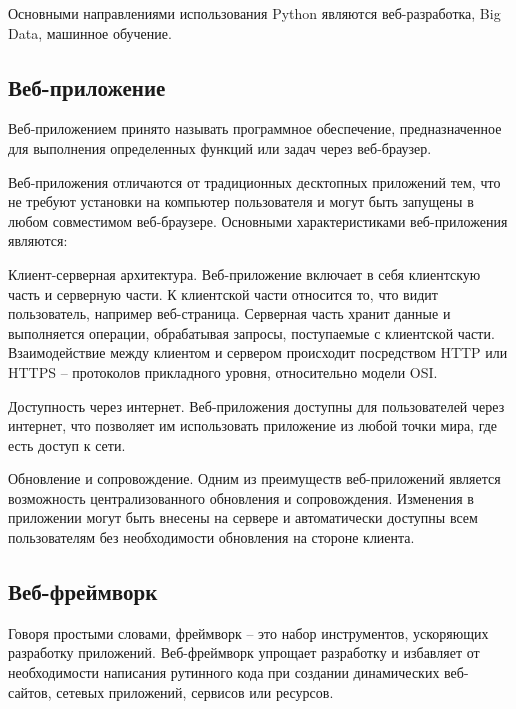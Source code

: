 Основными направлениями использования Python являются веб-разработка, Big Data, машинное обучение.


\subsection{Веб-приложение}\label{subsec:domain:web-application}
Веб-приложением принято называть программное обеспечение, предназначенное для выполнения определенных функций или задач через веб-браузер.

Веб-приложения отличаются от традиционных десктопных приложений тем, что не требуют установки на компьютер пользователя и могут быть запущены в любом совместимом веб-браузере.
Основными характеристиками веб-приложения являются:
\begin{enumerate_num}
    \item Клиент-серверная архитектура.
    Веб-приложение включает в себя клиентскую часть и серверную части.
    К клиентской части относится то, что видит пользователь, например веб-страница.
    Серверная часть хранит данные и выполняется операции, обрабатывая запросы, поступаемые с клиентской части.
    Взаимодействие между клиентом и сервером происходит посредством HTTP или HTTPS -- протоколов прикладного уровня, относительно модели OSI.
    \item Доступность через интернет.
    Веб-приложения доступны для пользователей через интернет, что позволяет им использовать приложение из любой точки мира, где есть доступ к сети.
    \item Обновление и сопровождение.
    Одним из преимуществ веб-приложений является возможность централизованного обновления и сопровождения.
    Изменения в приложении могут быть внесены на сервере и автоматически доступны всем пользователям без необходимости обновления на стороне клиента.
\end{enumerate_num}


\subsection{Веб-фреймворк}\label{subsec:domain:web-framework}
Говоря простыми словами, фреймворк -- это набор инструментов, ускоряющих разработку приложений.
Веб-фреймворк\cite{web_framework_desc} упрощает разработку и избавляет от необходимости написания рутинного кода при создании динамических веб-сайтов, сетевых приложений, сервисов или ресурсов.

